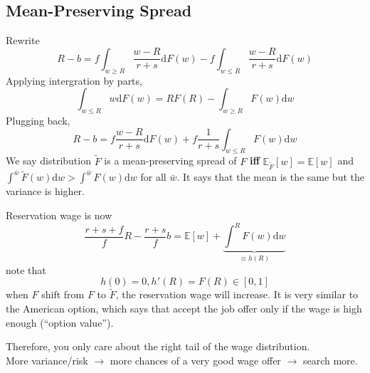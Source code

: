 \documentclass[11pt,a4paper]{article}
\begin{document}
\subsection{Mean-Preserving Spread}
Rewrite \begin{equation}
  R - b = f \int_{w\geq R} \frac{w-R}{r+s} \mathrm{d}F(w) - f \int_{w\leq R} \frac{w-R}{r+s}\mathrm{d}F(w) 
\end{equation}
Applying intergration by parts,
\begin{equation}
  \int_{w\leq R} w \mathrm{d}F(w) = R F(R) - \int_{w\geq R} F(w)\mathrm{d}w 
\end{equation}
Plugging back, 
\begin{equation}
  R - b = f \frac{w-R}{r+s} \mathrm{d}F(w) + f \frac{1}{r+s} \int_{w\leq R} F(w)\mathrm{d}w 
\end{equation}
We say distribution $\tilde{F}$ is a mean-preserving spread of $F$ \textbf{iff} $\mathbb{E}_{\tilde{F}}[w] = \mathbb{E}[w]$ and $\int^{\bar{w}} \tilde{F}(w)\mathrm{d}w > \int^{\bar{w}} F(w)\mathrm{d}w$ for all $\bar{w}$.  
It says that the mean is the same but the variance is higher. 

Reservation wage is now 
\begin{equation}
  \frac{r+s + f}{f}R - \frac{r+s}{f}b = \mathbb{E}[w] + \underbrace{\int^{R}F(w)\mathrm{d}w }_{\equiv h(R)} 
\end{equation}
note that
\begin{equation}
  h(0) = 0 , h'(R) = F(R)\in [0,1]
\end{equation}
when $F$ shift from $F$ to $\tilde{F}$, the reservation wage will increase. 
It is very similar to the American option, which says that accept the job offer only if the wage is high enough (``option value''). 

Therefore, you only care about the right tail of the wage distribution. \\ 
More variance/risk $\to$ more chances of a very good wage offer $\to $ search more. 
\end{document}
